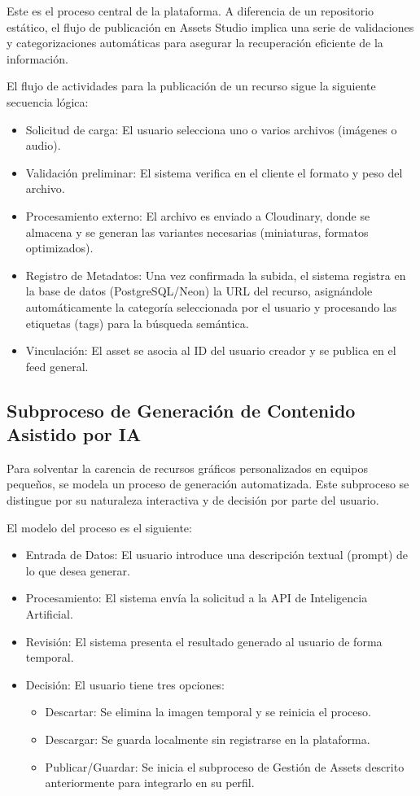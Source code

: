 Este es el proceso central de la plataforma. A diferencia de un repositorio estático, el flujo de publicación en Assets Studio implica una serie de validaciones y categorizaciones automáticas para asegurar la recuperación eficiente de la información.

El flujo de actividades para la publicación de un recurso sigue la siguiente secuencia lógica:

\begin{itemize}
    \item Solicitud de carga: El usuario selecciona uno o varios archivos (imágenes o audio).
    \item Validación preliminar: El sistema verifica en el cliente el formato y peso del archivo.
    \item Procesamiento externo: El archivo es enviado a Cloudinary, donde se almacena y se generan las variantes necesarias (miniaturas, formatos optimizados).
    \item Registro de Metadatos: Una vez confirmada la subida, el sistema registra en la base de datos (PostgreSQL/Neon) la URL del recurso, asignándole automáticamente la categoría seleccionada por el usuario y procesando las etiquetas (tags) para la búsqueda semántica.
    \item Vinculación: El asset se asocia al ID del usuario creador y se publica en el feed general.
\end{itemize}

\subsection{Subproceso de Generación de Contenido Asistido por IA}

Para solventar la carencia de recursos gráficos personalizados en equipos pequeños, se modela un proceso de generación automatizada. Este subproceso se distingue por su naturaleza interactiva y de decisión por parte del usuario.

El modelo del proceso es el siguiente:

\begin{itemize}
    \item Entrada de Datos: El usuario introduce una descripción textual (prompt) de lo que desea generar.
    \item Procesamiento: El sistema envía la solicitud a la API de Inteligencia Artificial.
    \item Revisión: El sistema presenta el resultado generado al usuario de forma temporal.
    \item Decisión: El usuario tiene tres opciones:
     \begin{itemize}
        \item Descartar: Se elimina la imagen temporal y se reinicia el proceso.
        \item Descargar: Se guarda localmente sin registrarse en la plataforma.
        \item Publicar/Guardar: Se inicia el subproceso de Gestión de Assets descrito anteriormente para integrarlo en su perfil.
    \end{itemize}
\end{itemize}

